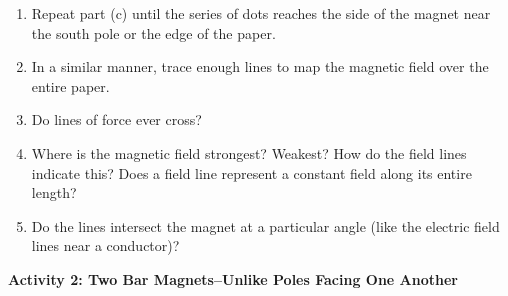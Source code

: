 \begin{enumerate}[labparts]
\item Repeat part (c) until the series of dots reaches the side of the magnet near 
the south pole or the edge of the paper.
\item In a similar manner, trace enough lines to map the magnetic field
over the entire paper.
\item Do lines of force ever cross?
\answerspace{15mm}

\item Where is the magnetic field strongest? Weakest? How do the field
lines indicate this? Does a field line represent a constant field
along its entire length?
\answerspace{15mm}

\item Do the lines intersect the magnet at a particular angle (like the
electric field lines near a conductor)?
\answerspace{15mm}
\end{enumerate}

\textbf{Activity 2: Two Bar Magnets--Unlike Poles Facing One Another}

